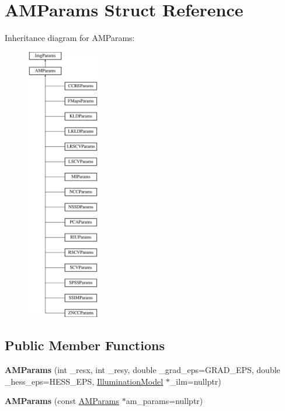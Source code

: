 \hypertarget{structAMParams}{\section{A\-M\-Params Struct Reference}
\label{structAMParams}
}
Inheritance diagram for A\-M\-Params\-:\begin{figure}[H]
\begin{center}
\leavevmode
\includegraphics[height=12.000000cm]{structAMParams}
\end{center}
\end{figure}
\subsection*{Public Member Functions}
\begin{DoxyCompactItemize}
\item 
\hypertarget{structAMParams_a750182dcee7d777bc63cad82154f7ff9}{{\bfseries A\-M\-Params} (int \-\_\-resx, int \-\_\-resy, double \-\_\-grad\-\_\-eps=G\-R\-A\-D\-\_\-\-E\-P\-S, double \-\_\-hess\-\_\-eps=H\-E\-S\-S\-\_\-\-E\-P\-S, \hyperlink{classIlluminationModel}{Illumination\-Model} $\ast$\-\_\-ilm=nullptr)}\label{structAMParams_a750182dcee7d777bc63cad82154f7ff9}

\item 
\hypertarget{structAMParams_acea86047c12b02c939ac428722c33361}{{\bfseries A\-M\-Params} (const \hyperlink{structAMParams}{A\-M\-Params} $\ast$am\-\_\-params=nullptr)}\label{structAMParams_acea86047c12b02c939ac428722c33361}

\end{DoxyCompactItemize}

